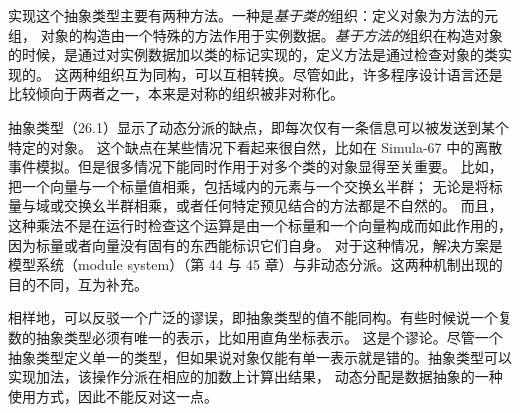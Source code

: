 实现这个抽象类型主要有两种方法。一种是\textit{基于类的}组织：定义对象为方法的元组，
对象的构造由一个特殊的方法作用于实例数据。\textit{基于方法的}组织在构造对象的时候，是通过对实例数据加以类的标记实现的，定义方法是通过检查对象的类实现的。
这两种组织互为同构，可以互相转换。尽管如此，许多程序设计语言还是比较倾向于两者之一，本来是对称的组织被非对称化。

抽象类型（26.1）显示了动态分派的缺点，即每次仅有一条信息可以被发送到某个特定的对象。
这个缺点在某些情况下看起来很自然，比如在 Simula-67 中的离散事件模拟。但是很多情况下能同时作用于对多个类的对象显得至关重要。
比如，把一个向量与一个标量值相乘，包括域内的元素与一个交换幺半群；%
无论是将标量与域或交换幺半群相乘，或者任何特定预见结合的方法都是不自然的。%
而且，这种乘法不是在运行时检查这个运算是由一个标量和一个向量构成而如此作用的，因为标量或者向量没有固有的东西能标识它们自身。
对于这种情况，解决方案是模型系统（module system）（第 44 与 45 章）与非动态分派。这两种机制出现的目的不同，互为补充。

相样地，可以反驳一个广泛的谬误，即抽象类型的值不能同构。有些时候说一个复数的抽象类型必须有唯一的表示，比如用直角坐标表示。
这是个谬论。尽管一个抽象类型定义单一的类型，但如果说对象仅能有单一表示就是错的。抽象类型可以实现加法，该操作分派在相应的加数上计算出结果，
动态分配是数据抽象的一种使用方式，因此不能反对这一点。%
